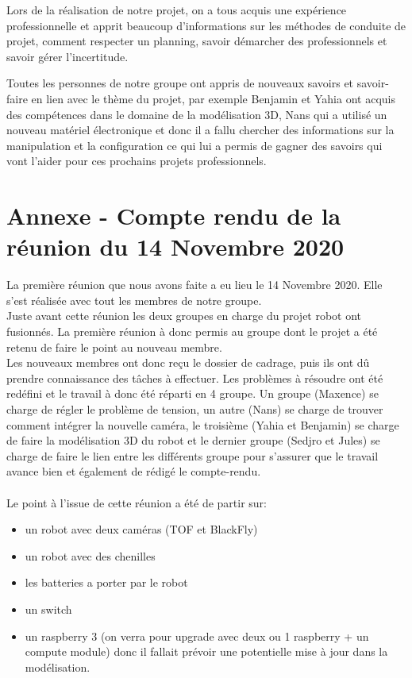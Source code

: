 \documentclass{PackagerQualityN}
\begin{document}
Lors de la réalisation de notre projet, on a tous acquis une expérience professionnelle et apprit beaucoup d’informations sur les méthodes de conduite de projet, comment respecter un planning, savoir démarcher des professionnels et savoir gérer l’incertitude.

Toutes les personnes de notre groupe ont appris de nouveaux savoirs et savoir-faire en lien avec le thème du projet, par exemple Benjamin et Yahia ont acquis des compétences dans le domaine de la modélisation 3D, Nans qui a utilisé un nouveau matériel électronique et donc il a fallu chercher des informations sur la manipulation et la configuration ce qui lui a permis de gagner des savoirs qui vont l’aider pour ces prochains projets professionnels.

\newp  

\appendix
\section*{Annexe - Compte rendu de la réunion du 14 Novembre 2020}
La première réunion que nous avons faite a eu lieu le 14 Novembre 2020. Elle s'est réalisée avec tout les membres de notre groupe.
\\

Juste avant cette réunion les deux groupes en charge du projet robot ont fusionnés. La première réunion à donc permis au groupe dont le projet a été retenu de faire le point au nouveau membre. 
\\

Les nouveaux membres ont donc reçu le dossier de cadrage, puis ils ont dû prendre connaissance des tâches à effectuer. Les problèmes à résoudre ont été redéfini et le travail à donc été réparti en 4 groupe. Un groupe (Maxence) se charge de régler le problème de tension, un autre (Nans) se charge de trouver comment intégrer la nouvelle caméra, le troisième (Yahia et Benjamin) se charge de faire la modélisation 3D du robot et le dernier groupe (Sedjro et Jules) se charge de faire le lien entre les différents groupe pour s'assurer que le travail avance bien et également de rédigé le compte-rendu.
\\
\\
Le point à l'issue de cette réunion a été de partir sur:\\
\begin{itemize}
\item  un robot avec deux caméras (TOF et BlackFly)\\
\item   un robot avec des chenilles\\
\item  les batteries a porter par le robot\\
\item   un switch\\
\item   un raspberry 3 (on verra pour upgrade avec deux ou 1 raspberry + un compute module) donc il fallait prévoir une potentielle mise à jour dans la modélisation.
\end{itemize}
\end{document}
